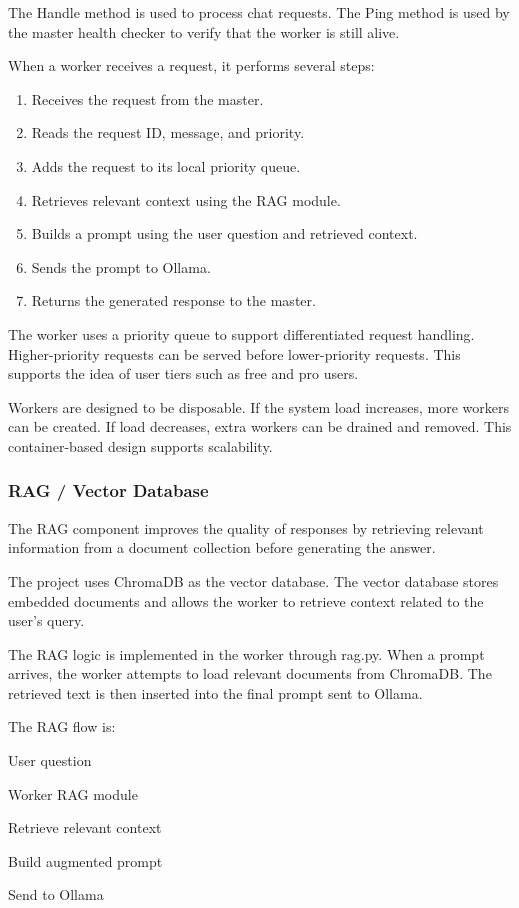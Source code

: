 The Handle method is used to process chat requests. The Ping method is used by the master health checker to verify that the worker is still alive.

When a worker receives a request, it performs several steps:
\begin{enumerate}[leftmargin=1.8em]
  \item Receives the request from the master.
  \item Reads the request ID, message, and priority.
  \item Adds the request to its local priority queue.
  \item Retrieves relevant context using the RAG module.
  \item Builds a prompt using the user question and retrieved context.
  \item Sends the prompt to Ollama.
  \item Returns the generated response to the master.
\end{enumerate}

The worker uses a priority queue to support differentiated request handling. Higher-priority requests can be served before lower-priority requests. This supports the idea of user tiers such as free and pro users.

Workers are designed to be disposable. If the system load increases, more workers can be created. If load decreases, extra workers can be drained and removed. This container-based design supports scalability.

\subsubsection{RAG / Vector Database}
The RAG component improves the quality of responses by retrieving relevant information from a document collection before generating the answer.

The project uses ChromaDB as the vector database. The vector database stores embedded documents and allows the worker to retrieve context related to the user's query.

The RAG logic is implemented in the worker through rag.py. When a prompt arrives, the worker attempts to load relevant documents from ChromaDB. The retrieved text is then inserted into the final prompt sent to Ollama.

The RAG flow is:

\begin{center}
User question

Worker RAG module

Retrieve relevant context

Build augmented prompt

Send to Ollama
\end{center}

